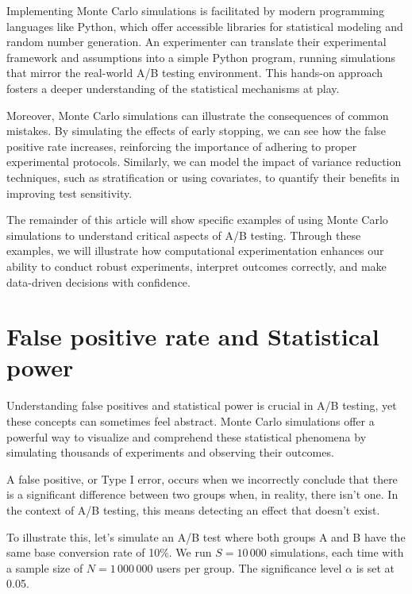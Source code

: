 \documentclass[final,5p,times,twocolumn,authoryear]{elsarticle}
\begin{document}
Implementing Monte Carlo simulations is facilitated by modern programming languages like Python, which offer accessible libraries for statistical modeling and random number generation. An experimenter can translate their experimental framework and assumptions into a simple Python program, running simulations that mirror the real-world A/B testing environment. This hands-on approach fosters a deeper understanding of the statistical mechanisms at play.

Moreover, Monte Carlo simulations can illustrate the consequences of common mistakes. By simulating the effects of early stopping, we can see how the false positive rate increases, reinforcing the importance of adhering to proper experimental protocols. Similarly, we can model the impact of variance reduction techniques, such as stratification or using covariates, to quantify their benefits in improving test sensitivity.

The remainder of this article will show specific examples of using Monte Carlo simulations to understand critical aspects of A/B testing. Through these examples, we will illustrate how computational experimentation enhances our ability to conduct robust experiments, interpret outcomes correctly, and make data-driven decisions with confidence.

\section{False positive rate and Statistical power}

Understanding false positives and statistical power is crucial in A/B testing, yet these concepts can sometimes feel abstract. Monte Carlo simulations offer a powerful way to visualize and comprehend these statistical phenomena by simulating thousands of experiments and observing their outcomes.

A false positive, or Type I error, occurs when we incorrectly conclude that there is a significant difference between two groups when, in reality, there isn't one. In the context of A/B testing, this means detecting an effect that doesn't exist.

To illustrate this, let's simulate an A/B test where both groups A and B have the same base conversion rate of 10\%. We run $ S = 10\,000 $ simulations, each time with a sample size of $ N = 1\,000\,000 $ users per group. The significance level $ \alpha $ is set at 0.05.
\end{document}
